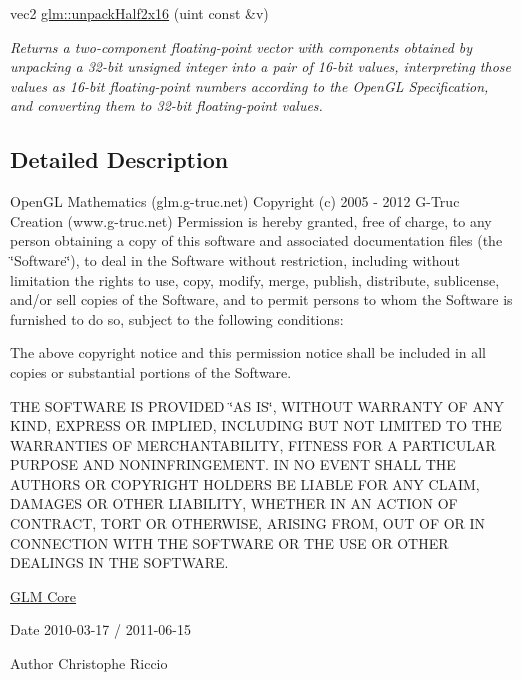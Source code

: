 \begin{DoxyCompactItemize}
\item 
vec2 \hyperlink{group__core__func__packing_ga4051804cc2c930ba4ca73382b79edf1d}{glm\-::unpack\-Half2x16} (uint const \&v)
\begin{DoxyCompactList}\small\item\em Returns a two-\/component floating-\/point vector with components obtained by unpacking a 32-\/bit unsigned integer into a pair of 16-\/bit values, interpreting those values as 16-\/bit floating-\/point numbers according to the Open\-G\-L Specification, and converting them to 32-\/bit floating-\/point values. \end{DoxyCompactList}\end{DoxyCompactItemize}


\subsection{Detailed Description}
Open\-G\-L Mathematics (glm.\-g-\/truc.\-net) Copyright (c) 2005 -\/ 2012 G-\/\-Truc Creation (www.\-g-\/truc.\-net) Permission is hereby granted, free of charge, to any person obtaining a copy of this software and associated documentation files (the \char`\"{}\-Software\char`\"{}), to deal in the Software without restriction, including without limitation the rights to use, copy, modify, merge, publish, distribute, sublicense, and/or sell copies of the Software, and to permit persons to whom the Software is furnished to do so, subject to the following conditions\-:

The above copyright notice and this permission notice shall be included in all copies or substantial portions of the Software.

T\-H\-E S\-O\-F\-T\-W\-A\-R\-E I\-S P\-R\-O\-V\-I\-D\-E\-D \char`\"{}\-A\-S I\-S\char`\"{}, W\-I\-T\-H\-O\-U\-T W\-A\-R\-R\-A\-N\-T\-Y O\-F A\-N\-Y K\-I\-N\-D, E\-X\-P\-R\-E\-S\-S O\-R I\-M\-P\-L\-I\-E\-D, I\-N\-C\-L\-U\-D\-I\-N\-G B\-U\-T N\-O\-T L\-I\-M\-I\-T\-E\-D T\-O T\-H\-E W\-A\-R\-R\-A\-N\-T\-I\-E\-S O\-F M\-E\-R\-C\-H\-A\-N\-T\-A\-B\-I\-L\-I\-T\-Y, F\-I\-T\-N\-E\-S\-S F\-O\-R A P\-A\-R\-T\-I\-C\-U\-L\-A\-R P\-U\-R\-P\-O\-S\-E A\-N\-D N\-O\-N\-I\-N\-F\-R\-I\-N\-G\-E\-M\-E\-N\-T. I\-N N\-O E\-V\-E\-N\-T S\-H\-A\-L\-L T\-H\-E A\-U\-T\-H\-O\-R\-S O\-R C\-O\-P\-Y\-R\-I\-G\-H\-T H\-O\-L\-D\-E\-R\-S B\-E L\-I\-A\-B\-L\-E F\-O\-R A\-N\-Y C\-L\-A\-I\-M, D\-A\-M\-A\-G\-E\-S O\-R O\-T\-H\-E\-R L\-I\-A\-B\-I\-L\-I\-T\-Y, W\-H\-E\-T\-H\-E\-R I\-N A\-N A\-C\-T\-I\-O\-N O\-F C\-O\-N\-T\-R\-A\-C\-T, T\-O\-R\-T O\-R O\-T\-H\-E\-R\-W\-I\-S\-E, A\-R\-I\-S\-I\-N\-G F\-R\-O\-M, O\-U\-T O\-F O\-R I\-N C\-O\-N\-N\-E\-C\-T\-I\-O\-N W\-I\-T\-H T\-H\-E S\-O\-F\-T\-W\-A\-R\-E O\-R T\-H\-E U\-S\-E O\-R O\-T\-H\-E\-R D\-E\-A\-L\-I\-N\-G\-S I\-N T\-H\-E S\-O\-F\-T\-W\-A\-R\-E.

\hyperlink{group__core}{G\-L\-M Core}

\begin{DoxyDate}{Date}
2010-\/03-\/17 / 2011-\/06-\/15 
\end{DoxyDate}
\begin{DoxyAuthor}{Author}
Christophe Riccio 
\end{DoxyAuthor}
